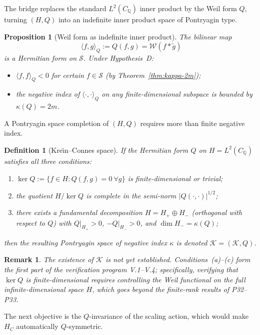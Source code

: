 \documentclass[11pt]{amsart}
\newtheorem{proposition}[theorem]{Proposition}
\newtheorem{definition}[theorem]{Definition}
\newtheorem{remark}[theorem]{Remark}
\newcommand{\kap}{\kappa}
\newcommand{\CQ}{C_{\mathbb{Q}}}
\newcommand{\Kcal}{\mathcal{K}}
\newcommand{\Scal}{\mathcal{S}}
\newcommand{\Wcal}{\mathcal{W}}
\begin{document}
The bridge replaces the standard $L^2(\CQ)$ inner product by the Weil form $Q$, turning
$(H, Q)$ into an indefinite inner product space of Pontryagin type.

\begin{proposition}[Weil form as indefinite inner product]\label{prop:indefinite}
The bilinear map
\[
  \langle f, g \rangle_Q := Q(f, g) = \Wcal(f * \tilde g)
\]
is a Hermitian form on $\Scal$.  Under Hypothesis~D:
\begin{itemize}
\item $\langle f,f\rangle_Q < 0$ for certain $f \in \Scal$ (by Theorem~\ref{thm:kappa-2m});
\item the negative index of $\langle\cdot,\cdot\rangle_Q$ on any finite-dimensional
  subspace is bounded by $\kap(Q) = 2m$.
\end{itemize}
\end{proposition}

A Pontryagin space completion of $(H, Q)$ requires more than finite negative index.

\begin{definition}[Kre\u{\i}n--Connes space]\label{def:KC}
If the Hermitian form $Q$ on $H = L^2(\CQ)$ satisfies all three conditions:
\begin{enumerate}
\item[(a)] $\ker Q := \{f \in H : Q(f,g)=0\ \forall g\}$ is finite-dimensional or trivial;
\item[(b)] the quotient $H/\ker Q$ is complete in the semi-norm $|Q(\cdot,\cdot)|^{1/2}$;
\item[(c)] there exists a fundamental decomposition $H = H_+ \oplus H_-$ (orthogonal
  with respect to $Q$) with $Q|_{H_+} > 0$, $-Q|_{H_-} > 0$, and $\dim H_- = \kap(Q)$;
\end{enumerate}
then the resulting Pontryagin space of negative index $\kap$ is denoted $\Kcal =
(\Kcal, Q)$.
\end{definition}

\begin{remark}\label{rem:KC-not-constructed}
The existence of $\Kcal$ is \emph{not yet established}.  Conditions~(a)--(c) form the
first part of the verification program V.1--V.4; specifically, verifying that $\ker Q$ is
finite-dimensional requires controlling the Weil functional on the full infinite-dimensional
space $H$, which goes beyond the finite-rank results of P32--P33.
\end{remark}

The next objective is the $Q$-invariance of the scaling action, which would make $H_C$
automatically $Q$-symmetric.
\end{document}

